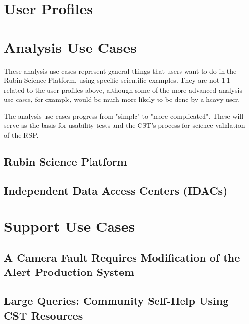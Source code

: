 \documentclass[DM,lsstdraft,authoryear,toc]{lsstdoc}
\begin{document}
\clearpage
\section{User Profiles}




\clearpage
\section{Analysis Use Cases}

These analysis use cases represent general things that users want to do in the Rubin Science Platform,
using specific scientific examples.
They are not 1:1 related to the user profiles above, although some of the more advanced analysis
use cases, for example, would be much more likely to be done by a heavy user.

The analysis use cases progress from "simple" to "more complicated".
These will serve as the basis for usability tests and the CST's process for science validation of
the RSP.

\subsection{Rubin Science Platform}



\subsection{Independent Data Access Centers (IDACs)}




\clearpage
\section{Support Use Cases}

\clearpage


\clearpage


\clearpage


\clearpage
\subsection{A Camera Fault Requires Modification of the Alert Production System}


\clearpage
\subsection{Large Queries: Community Self-Help Using CST Resources}

\end{document}
